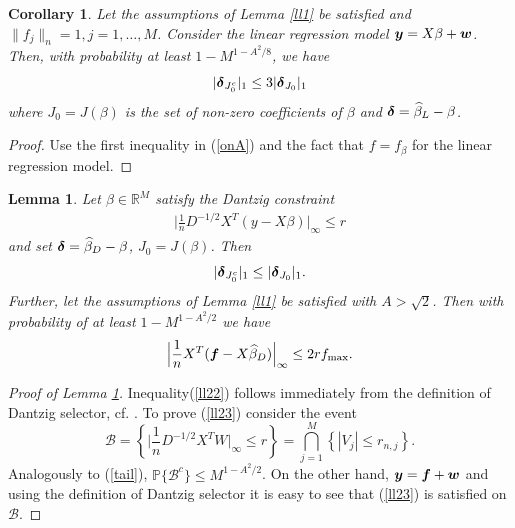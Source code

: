 \documentclass[dvips,aos]{imsart}
\numberwithin{equation}{section}
\theoremstyle{plain}
\newtheorem{cor}[thm]{Corollary}%
\newtheorem{lemma}[thm]{Lemma}
\def\wh{\widehat}
\def\B{\mbox{$\mathcal B$}}
\def\RR{\mathbb R}
\def\PP{\mathbb{P}}
\newcommand{\bD}{\mbox{\boldmath$\delta$}}
\newcommand{\bb}{\mbox{\boldmath$\beta$}}
\def\bb{\beta}
\newcommand{\bmf}{\mbox{\boldmath$f$}}
\newcommand{\bmy}{\mbox{\boldmath$y$}}
\newcommand{\bmw}{\mbox{\boldmath$w$}}
\begin{document}
\begin{cor}\label{corx}
Let the assumptions of Lemma \ref{ll1} be satisfied and
$\|f_j\|_n=1, j=1,\dots,M$. Consider the linear regression model
$\bmy=X\bb+\bmw$. Then, with probability at least $1-M^{1-A^2/8}$,
we have
$$
|\bD_{J_0^c}|_1 \le 3|\bD_{J_0}|_1
$$
where $J_0=J(\beta)$ is the set of non-zero coefficients of $\beta$
and $\bD=\wh\beta_L-\beta$.
\end{cor}
\begin{proof} Use the first inequality in (\ref{onA}) and the fact
that $f=f_\beta$ for the linear regression model.
\end{proof}
\begin{lemma}\label{ll2}
Let $\beta\in\RR^M$ satisfy the Dantzig constraint
\begin{equation*}\begin{split}%
\Big|\frac{1}{n}D^{-1/2}X^T(y-X\beta)\Big|_\infty \le r
\end{split}\end{equation*}
and set $\bD=\wh\beta_D-\beta$, $J_0=J(\beta)$. Then
\begin{equation}\begin{split}\label{ll22}
|\bD_{J_0^c}|_1\le |\bD_{J_0}|_1.
\end{split}\end{equation}
Further, let the assumptions of Lemma \ref{ll1} be satisfied with
$A>\sqrt{2}$. Then with probability of at least $1-M^{1-A^2/2}$ we
have
\begin{equation}\begin{split}\label{ll23}
\Big|\frac{1}{n}X^T({\bmf}-X\widehat\beta_D)\Big|_\infty \le
2rf_{\max}.
\end{split}\end{equation}
\end{lemma}


\begin{proof}[Proof of Lemma \ref{ll2}] Inequality(\ref{ll22}) follows immediately
from the definition of Dantzig selector, cf. \cite{ct07}. To prove
(\ref{ll23}) consider the event
\[ \B = \left\{\Big|\frac{1}{n}D^{-1/2}X^TW\Big|_\infty \le r\right\}
=\bigcap_{j=1}^M \left\{  | V_j | \leq r_{n,j} \right\}.\]
Analogously to (\ref{tail}), $\PP \{ \B^c\}  \le M^{1-A^2/2}$. On
the other hand, $\bmy={\bmf }+ \bmw$ and using the definition of Dantzig
selector it is easy to see that (\ref{ll23}) is satisfied on $\B$.

\end{proof}
\end{document}
